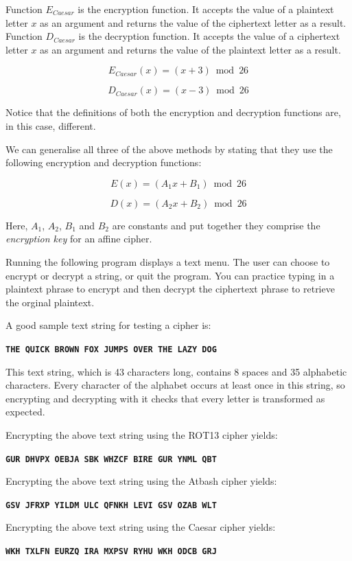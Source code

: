 Function $E_{Caesar}$ is the encryption function. It accepts the value of a plaintext letter $x$ as an argument and returns the value of the ciphertext letter as a result. Function $D_{Caesar}$ is the decryption function. It accepts the value of a ciphertext letter $x$ as an argument and returns the value of the plaintext letter as a result.

\[
  E_{Caesar}(x) = (x + 3) \bmod 26
\]

\[
  D_{Caesar}(x) = (x - 3) \bmod 26
\]

Notice that the definitions of both the encryption and decryption functions are, in this case, different.

We can generalise all three of the above methods by stating that they use the following encryption and decryption functions:

\[
 E(x) = (A_{1}x + B_{1}) \bmod 26
\]

\[
 D(x) = (A_{2}x + B_{2}) \bmod 26
\]

Here, $A_{1}$, $A_{2}$, $B_{1}$ and $B_{2}$ are constants and put together they comprise the {\it encryption key} for an affine cipher.

Running the following program displays a text menu. The user can choose to encrypt or decrypt a string, or quit the program. You can practice typing in a plaintext phrase to encrypt and then decrypt the ciphertext phrase to retrieve the orginal plaintext.

A good sample text string for testing a cipher is:

\texttt{\bf THE QUICK BROWN FOX JUMPS OVER THE LAZY DOG}

This text string, which is 43 characters long, contains 8 spaces and 35 alphabetic characters. Every character of the alphabet occurs at least once in this string, so encrypting and decrypting with it checks that every letter is transformed as expected.

Encrypting the above text string using the ROT13 cipher yields:

\texttt{\bf GUR DHVPX OEBJA SBK WHZCF BIRE GUR YNML QBT}

Encrypting the above text string using the Atbash cipher yields:

\texttt{\bf GSV JFRXP YILDM ULC QFNKH LEVI GSV OZAB WLT}

Encrypting the above text string using the Caesar cipher yields:

\texttt{\bf WKH TXLFN EURZQ IRA MXPSV RYHU WKH ODCB GRJ}

